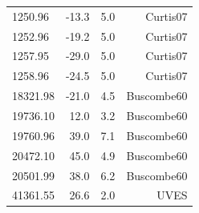\documentclass[11pt]{article}
\begin{document}
\begin{table}[htbp]
{\begin{tabular}{l r r r}
1250.96 & -13.3 & 5.0 & Curtis07 \\
1252.96 & -19.2 & 5.0 & Curtis07 \\
1257.95 & -29.0 & 5.0 & Curtis07 \\
1258.96 & -24.5 & 5.0 & Curtis07 \\
18321.98 & -21.0 & 4.5 & Buscombe60 \\
19736.10 & 12.0 & 3.2 & Buscombe60 \\
19760.96 & 39.0 & 7.1 & Buscombe60 \\
20472.10 & 45.0 & 4.9 & Buscombe60 \\
20501.99 & 38.0 & 6.2 & Buscombe60 \\
41361.55 & 26.6 & 2.0 & UVES \\
\bottomrule
\end{tabular}
}
\end{table}
\end{document}
